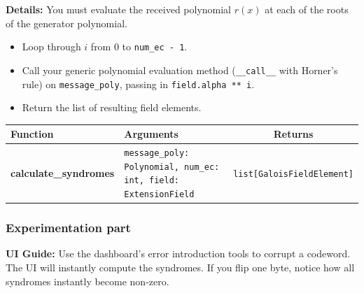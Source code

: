 \textbf{Details:} 
You must evaluate the received polynomial $r(x)$ at each of the roots of the generator polynomial.
\begin{itemize}
    \item Loop through $i$ from $0$ to \lstinline|num_ec - 1|.
    \item Call your generic polynomial evaluation method (\lstinline|__call__| with Horner's rule) on \lstinline|message_poly|, passing in \lstinline|field.alpha ** i|.
    \item Return the list of resulting field elements.
\end{itemize}

\begin{center}
\renewcommand{\arraystretch}{1.5}
\begin{tabularx}{\textwidth}{@{} >{\bfseries}l X c @{}}
\toprule
Function & Arguments & Returns \\ \midrule
calculate\_syndromes & \lstinline|message_poly: Polynomial, num_ec: int, field: ExtensionField| & \lstinline|list[GaloisFieldElement]| \\
\bottomrule
\end{tabularx}
\end{center}

\subsubsection*{Experimentation part}
\textbf{UI Guide:} Use the dashboard's error introduction tools to corrupt a codeword. The UI will instantly compute the syndromes. If you flip one byte, notice how all syndromes instantly become non-zero.

\vspace{1cm}

